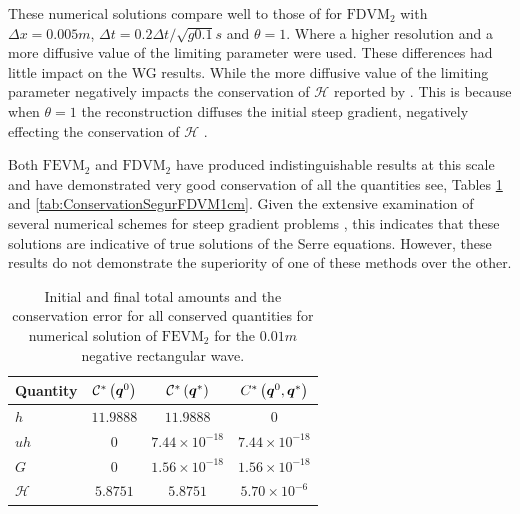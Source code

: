 These numerical solutions compare well to those of \citet{Zoppou-etal-2017} for $\text{FDVM}_2$ with $\Delta x = 0.005m$, $\Delta t = 0.2 \Delta t / \sqrt{g 0.1} s$ and $\theta = 1$. Where a higher resolution and a more diffusive value of the limiting parameter were used. These differences had little impact on the WG results. While the more diffusive value of the limiting parameter negatively impacts the conservation of $\mathcal{H}$ reported by \citet{Zoppou-etal-2017}. This is because when $\theta = 1$ the reconstruction diffuses the initial steep gradient, negatively effecting the conservation of $\mathcal{H}$ \cite{Pitt-2018-61}.

Both $\text{FEVM}_2$ and $\text{FDVM}_2$ have produced indistinguishable results at this scale and have demonstrated very good conservation of all the quantities see, Tables \ref{tab:ConservationSegurFEVM1cm} and \ref{tab:ConservationSegurFDVM1cm}. Given the extensive examination of several numerical schemes for steep gradient problems \cite{Pitt-2018-61}, this indicates that these solutions are indicative of true solutions of the Serre equations. However, these results do not demonstrate the superiority of one of these methods over the other. 
%
\begin{table}
	\centering
	\begin{tabular}{l  c  c c}
		Quantity& $\mathcal{C}^*\left(\boldsymbol{q}^0\right)$ & $\mathcal{C}^*\left(\boldsymbol{q}^*\right)$ & ${C}^*\left(\boldsymbol{q}^0,\boldsymbol{q}^*\right)$  \B\\
		\hline
		$h$ & $11.9888$ & $11.9888$ & $0$ \T\\
		$uh$ & $0$ & $7.44 \times 10^{-18}$ & $7.44 \times 10^{-18}$\\
		$G$ & $0$ & $1.56\times 10^{-18}$ & $1.56\times 10^{-18}$\\
		$\mathcal{H}$ & $5.8751$ & $5.8751$ & $5.70 \times 10^{-6}$ \B \\
		\hline
	\end{tabular}
	\caption{Initial and final total amounts and the conservation error for all conserved quantities for numerical solution of $\text{FEVM}_2$ for the $0.01m$ negative rectangular wave.}
	\label{tab:ConservationSegurFEVM1cm}
\end{table} 
%
